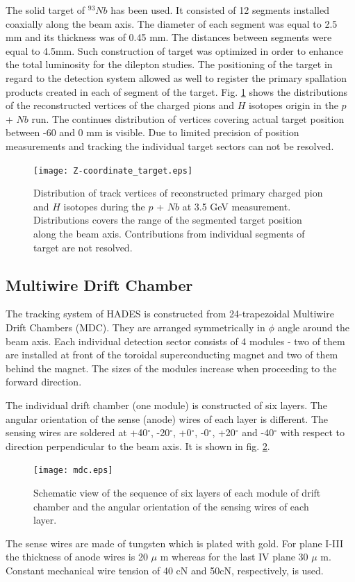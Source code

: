 The solid target of $^{93}Nb$ has been used. 
It consisted of 12 segments installed coaxially along the beam axis.
The diameter of each segment was equal to 2.5 mm and its thickness was of 0.45 mm.
The distances between segments were equal to 4.5mm. 
Such construction of target was optimized in order to enhance the total luminosity 
for the dilepton studies. 
The positioning of the target in regard to the detection system allowed as well to register 
the primary spallation products created in each of segment of the target.
Fig. \ref{Target_reconstruction} shows the distributions of the reconstructed vertices 
of the charged pions and $H$ isotopes origin in the $p$ + $Nb$ run. The continues distribution 
of vertices covering actual target position between -60 and 0 mm is visible. 
Due to limited precision of position measurements and tracking the individual target sectors 
can not be resolved. 

\begin{figure}[!h]
    \centering
    \texttt{[image: Z-coordinate\_target.eps]}
    \caption{Distribution of track vertices of reconstructed primary charged pion and $H$ isotopes 
    during the $p$ + $Nb$ at 3.5 GeV measurement. Distributions covers the range of the segmented target
    position along the beam axis. Contributions from individual segments of target are not resolved.}
    \label{Target_reconstruction}
\end{figure}

\subsection{Multiwire Drift Chamber}
The tracking system of HADES is constructed from 24-trapezoidal Multiwire Drift Chambers (MDC). 
They are arranged symmetrically in $\phi$ angle around the beam axis. 
Each individual detection sector consists of 4 modules -  two of them are installed at front 
of the toroidal superconducting magnet and two of them behind the magnet.
The sizes of the modules increase when proceeding to the forward direction. 

The individual drift chamber (one module) is constructed of six layers. 
The angular orientation of the sense (anode) wires of each layer is different. 
The sensing wires are soldered at +40$^\circ$,  -20$^\circ$, +0$^\circ$, -0$^\circ$, +20$^\circ$ and -40$^\circ$ 
with respect to direction perpendicular to the beam axis. It is shown in fig. \ref{mdc}.   
\begin{figure}[!h]
	\centering
	\texttt{[image: mdc.eps]}
	\caption{Schematic view of the sequence of six layers of each module of drift chamber 
	and the angular orientation of the sensing wires of each layer.}
	\label{mdc}
\end{figure}
The sense wires are made of tungsten which is plated with gold. 
For plane I-III the thickness of anode wires is 20 $\mu$ m whereas for the last IV plane 30 $\mu$ m.
Constant mechanical wire tension of 40 cN and 50cN, respectively, is used. 

